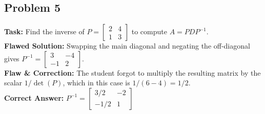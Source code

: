 \documentclass[11pt, a4paper]{article}
\theoremstyle{definition}
\theoremstyle{remark}
\begin{document}
\subsection{Problem 5}
\textbf{Task:} Find the inverse of $P = \begin{bmatrix} 2 & 4 \\ 1 & 3 \end{bmatrix}$ to compute $A = PDP^{-1}$. \\
\textbf{Flawed Solution:} Swapping the main diagonal and negating the off-diagonal gives $P^{-1} = \begin{bmatrix} 3 & -4 \\ -1 & 2 \end{bmatrix}$. \\
\textbf{Flaw \& Correction:} The student forgot to multiply the resulting matrix by the scalar $1/\det(P)$, which in this case is $1/(6-4) = 1/2$. \\
\textbf{Correct Answer:} $\displaystyle P^{-1} = \begin{bmatrix} 3/2 & -2 \\ -1/2 & 1 \end{bmatrix}$
\end{document}
